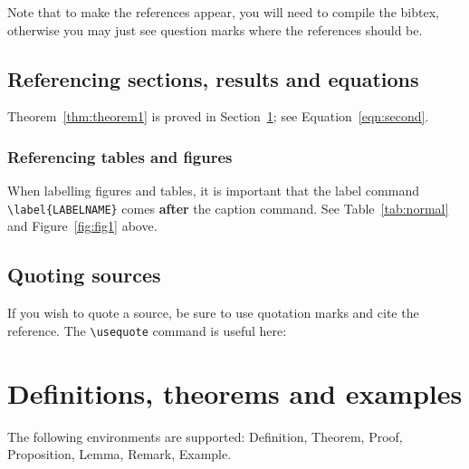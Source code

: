 \documentclass{mldsmsc}
\begin{document}
Note that to make the references appear, you will need to compile
the bibtex, otherwise you may just see question marks where the references
should be.


\subsection{Referencing sections, results and equations}

Theorem~\ref{thm:theorem1} is proved in Section~\ref{sec:defnthms}; see 
Equation~\eqref{eqn:second}.



\subsubsection{Referencing tables and figures}

When labelling figures and tables, it is important that the label command
\texttt{\textbackslash label\{LABELNAME\}} comes \textbf{after} the caption command.
See Table~\ref{tab:normal} and Figure~\ref{fig:fig1} above.

\subsection{Quoting sources}
If you wish to quote a source, be sure to use quotation marks and cite the
reference. The \texttt{\textbackslash{usequote}} command is useful here:

 \citep{dickens1859}

\clearpage


\section{Definitions, theorems and examples}
\label{sec:defnthms}

The following environments are supported:
Definition, Theorem, Proof, Proposition, Lemma, Remark, Example.
\end{document}
